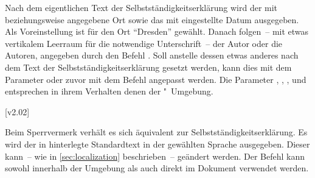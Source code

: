 \begin{DeclareEntity*}{}
\begin{DeclareEntity*}{}
\begin{DeclareEntity*}{}
\begin{Declaration}
\begin{Declaration}
\begin{Declaration}
\begin{Declaration}
\begin{Declaration}
\begin{Declaration}
\begin{Declaration}
\begin{Declaration}
\begin{Declaration}
\begin{Declaration}
Nach dem eigentlichen Text der Selbstständigkeitserklärung wird der mit 
 beziehungsweise  angegebene Ort sowie 
das mit  eingestellte Datum ausgegeben. Als Voreinstellung ist für 
den Ort \enquote{Dresden} gewählt. Danach folgen~-- mit etwas vertikalem 
Leerraum für die notwendige Unterschrift~-- der Autor oder die Autoren, 
angegeben durch den Befehl . Soll anstelle dessen etwas anderes 
nach dem Text der Selbstständigkeitserklärung gesetzt werden, kann dies mit dem 
Parameter  oder zuvor mit dem Befehl 
 angepasst werden. Die Parameter 
, , 
,  und 
 entsprechen in ihrem Verhalten denen 
der "~Umgebung.
\end{Declaration}
\end{Declaration}
\end{Declaration}
\end{Declaration}
\end{Declaration}
\end{Declaration}
\end{Declaration}
\end{Declaration}
\end{Declaration}
\end{Declaration}

\begin{Declaration}
  {}
  [v2.02]
\begin{Declaration}
  {}
\begin{Declaration}
  {}
\begin{Declaration}
  {}
\begin{Declaration}
  {}
\begin{Declaration}
  {}
\begin{Declaration}
  {}
\printdeclarationlist
%
Beim Sperrvermerk verhält es sich äquivalent zur Selbstständigkeitserklärung.
Es wird der in  hinterlegte Standardtext in der gewählten 
Sprache ausgegeben. Dieser kann~-- wie in \autoref{sec:localization} 
beschrieben~-- geändert werden. Der Befehl  kann sowohl 
innerhalb der Umgebung  als auch direkt im Dokument 
verwendet werden. 


\end{Declaration}
\end{Declaration}
\end{Declaration}
\end{Declaration}
\end{Declaration}
\end{Declaration}
\end{Declaration}
\end{DeclareEntity*}
\end{DeclareEntity*}
\end{DeclareEntity*}
